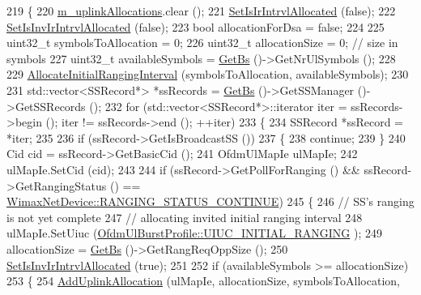 \begin{DoxyCode}
219 \{
220   \hyperlink{classns3_1_1UplinkSchedulerMBQoS_afdca0f835bd9f2b31ad19a7a2a2f4382}{m\_uplinkAllocations}.clear ();
221   \hyperlink{classns3_1_1UplinkScheduler_a3eee0d06486678eab4d352a274676d95}{SetIsIrIntrvlAllocated} (\textcolor{keyword}{false});
222   \hyperlink{classns3_1_1UplinkScheduler_a766e3b6c032052002929eb351934e42b}{SetIsInvIrIntrvlAllocated} (\textcolor{keyword}{false});
223   \textcolor{keywordtype}{bool} allocationForDsa = \textcolor{keyword}{false};
224 
225   uint32\_t symbolsToAllocation = 0;
226   uint32\_t allocationSize = 0; \textcolor{comment}{// size in symbols}
227   uint32\_t availableSymbols = \hyperlink{classns3_1_1UplinkScheduler_afe61b7de71d92d2dff1b135744a6ff7e}{GetBs} ()->GetNrUlSymbols ();
228 
229   \hyperlink{classns3_1_1UplinkSchedulerMBQoS_a6a9a487024bc6253cb5cada269994d24}{AllocateInitialRangingInterval} (symbolsToAllocation, availableSymbols);
230 
231   std::vector<SSRecord*> *ssRecords = \hyperlink{classns3_1_1UplinkScheduler_afe61b7de71d92d2dff1b135744a6ff7e}{GetBs} ()->GetSSManager ()->GetSSRecords ();
232   \textcolor{keywordflow}{for} (std::vector<SSRecord*>::iterator iter = ssRecords->begin (); iter != ssRecords->end (); ++iter)
233     \{
234       SSRecord *ssRecord = *iter;
235 
236       \textcolor{keywordflow}{if} (ssRecord->GetIsBroadcastSS ())
237         \{
238           \textcolor{keywordflow}{continue};
239         \}
240       Cid cid = ssRecord->GetBasicCid ();
241       OfdmUlMapIe ulMapIe;
242       ulMapIe.SetCid (cid);
243 
244       \textcolor{keywordflow}{if} (ssRecord->GetPollForRanging () && ssRecord->GetRangingStatus () == 
      \hyperlink{classns3_1_1WimaxNetDevice_a2a74c0f01e51abc1851a630242e7b591ace0a03105b6d7cf2c6ec79e9789dc3a6}{WimaxNetDevice::RANGING\_STATUS\_CONTINUE})
245         \{
246           \textcolor{comment}{// SS's ranging is not yet complete}
247           \textcolor{comment}{// allocating invited initial ranging interval}
248           ulMapIe.SetUiuc (\hyperlink{classns3_1_1OfdmUlBurstProfile_ae528783c4b3c6700ff49dfd7a555cb3daaea7b6256d4bcd0125f0248c0560c94e}{OfdmUlBurstProfile::UIUC\_INITIAL\_RANGING}
      );
249           allocationSize = \hyperlink{classns3_1_1UplinkScheduler_afe61b7de71d92d2dff1b135744a6ff7e}{GetBs} ()->GetRangReqOppSize ();
250           \hyperlink{classns3_1_1UplinkScheduler_a766e3b6c032052002929eb351934e42b}{SetIsInvIrIntrvlAllocated} (\textcolor{keyword}{true});
251 
252           \textcolor{keywordflow}{if} (availableSymbols >= allocationSize)
253             \{
254               \hyperlink{classns3_1_1UplinkSchedulerMBQoS_a23b74ad65ec3d22b55d25648addd7486}{AddUplinkAllocation} (ulMapIe, allocationSize, symbolsToAllocation, 

\end{DoxyCode}
